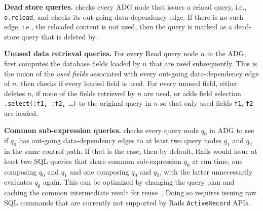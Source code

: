 \textbf{Dead store queries.}  \Tool checks every ADG node that issues a reload query, i.e., {\tt o.reload}, %
and checks its out-going data-dependency
edge. If there is no such edge, i.e., the reloaded content is not used, then the query is marked as a dead-store query that is deleted by \Tool.

\textbf{Unused data retrieval queries.} For every Read query node $n$ in the ADG, \Tool first computes the database fields loaded by $n$ that are used subsequently. This is the union of
the \textit{used fields} associated with every out-going data-dependency edge of $n$. 
\Tool then checks if every loaded field is used. For every unused field,
\Tool either deletes $n$, if none of the fields retrieved by $n$ are used, or adds field
selection {\tt .select(:f1, :f2, \ldots)} to the original query in $n$ so that only used fields
{\tt f1}, {\tt f2} are loaded. 


\textbf{Common sub-expression queries.} \Tool checks every query node $q_0$
in ADG to see if $q_0$ has out-going data-dependency edges
to at least two query nodes $q_1$ and $q_2$ in the same control path. If that is the case, then
by default, Rails would issue at least two SQL queries that
share common sub-expression $q_0$ at 
run time, one composing $q_0$ and $q_1$ and one composing 
$q_0$ and $q_2$,
with the latter unnecessarily evaluates $q_0$ again.
This can be optimized by changing the query plan and caching the common intermediate result for reuse~\cite{yan:cikm17}. 
Doing so requires issuing raw SQL commands that are currently not supported
by Rails {\tt ActiveRecord} APIs. 


